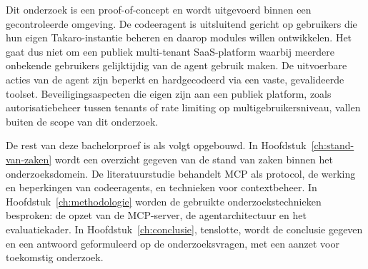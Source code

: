 Dit onderzoek is een proof-of-concept en wordt uitgevoerd binnen een gecontroleerde omgeving. De codeeragent is uitsluitend gericht op gebruikers die hun eigen Takaro-instantie beheren en daarop modules willen ontwikkelen. Het gaat dus niet om een publiek multi-tenant SaaS-platform waarbij meerdere onbekende gebruikers gelijktijdig van de agent gebruik maken. De uitvoerbare acties van de agent zijn beperkt en hardgecodeerd via een vaste, gevalideerde toolset. Beveiligingsaspecten die eigen zijn aan een publiek platform, zoals autorisatiebeheer tussen tenants of rate limiting op multigebruikersniveau, vallen buiten de scope van dit onderzoek.

De rest van deze bachelorproef is als volgt opgebouwd. In Hoofdstuk~\ref{ch:stand-van-zaken} wordt een overzicht gegeven van de stand van zaken binnen het onderzoeksdomein. De literatuurstudie behandelt MCP als protocol, de werking en beperkingen van codeeragents, en technieken voor contextbeheer. In Hoofdstuk~\ref{ch:methodologie} worden de gebruikte onderzoekstechnieken besproken: de opzet van de MCP-server, de agentarchitectuur en het evaluatiekader. In Hoofdstuk~\ref{ch:conclusie}, tenslotte, wordt de conclusie gegeven en een antwoord geformuleerd op de onderzoeksvragen, met een aanzet voor toekomstig onderzoek.
